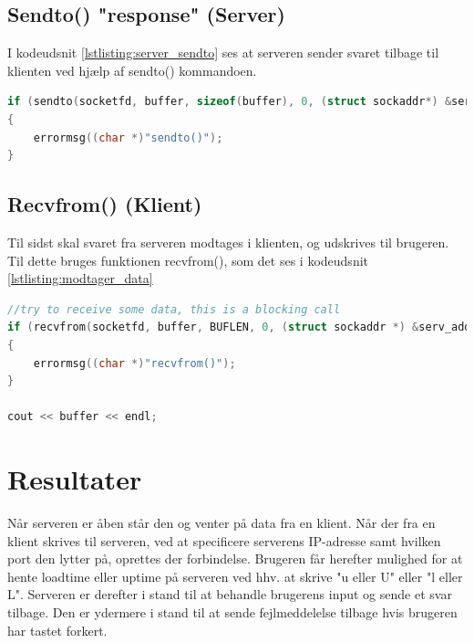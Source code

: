 \documentclass[12pt,fleqn,a4paper]{report}
\begin{document}
\section{Sendto() "response" (Server)}
I kodeudsnit \ref{lstlisting:server_sendto} ses at serveren sender svaret tilbage til klienten ved hjælp af sendto() kommandoen.
\begin{framed}
	\begin{lstlisting}[language=C++]
if (sendto(socketfd, buffer, sizeof(buffer), 0, (struct sockaddr*) &serv_addr, slen) == -1)
{
	errormsg((char *)"sendto()");
}	
	\end{lstlisting}
\end{framed}
\label{lstlisting:server_sendto}
\vspace{5mm} %

\section{Recvfrom() (Klient)}
Til sidst skal svaret fra serveren modtages i klienten, og udskrives til brugeren. Til dette bruges funktionen recvfrom(), som det ses i kodeudsnit \ref{lstlisting:modtager_data}
\begin{framed}
	\begin{lstlisting}[language=C++]
//try to receive some data, this is a blocking call
if (recvfrom(socketfd, buffer, BUFLEN, 0, (struct sockaddr *) &serv_addr, (socklen_t*)&slen) == -1)
{
	errormsg((char *)"recvfrom()");
}

cout << buffer << endl;	
	\end{lstlisting}
\end{framed}
\label{lstlisting:modtager_data}
\vspace{5mm} %


\chapter{Resultater}
Når serveren er åben står den og venter på data fra en klient.
Når der fra en klient skrives til serveren, ved at specificere serverens IP-adresse samt hvilken port den lytter på, oprettes der forbindelse. Brugeren får herefter mulighed for at hente loadtime eller uptime på serveren ved hhv. at skrive "u eller U" eller "l eller L". Serveren er derefter i stand til at behandle brugerens input og sende et svar tilbage. Den er ydermere i stand til at sende fejlmeddelelse tilbage hvis brugeren har tastet forkert.
\end{document}
